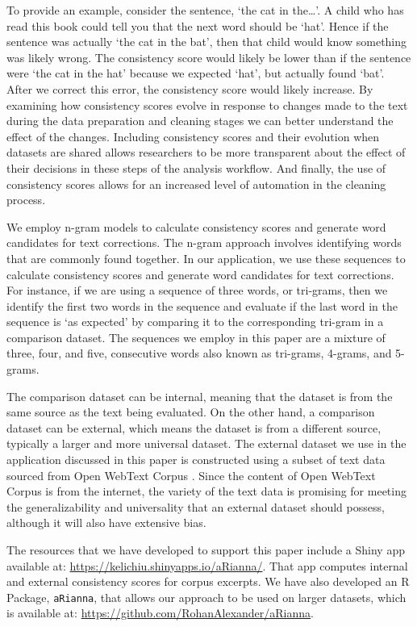 \documentclass[11pt,]{article}
\begin{document}
To provide an example, consider the sentence, `the cat in the\dots'. A child who has read this book could tell you that the next word should be `hat'. Hence if the sentence was actually `the cat in the bat', then that child would know something was likely wrong. The consistency score would likely be lower than if the sentence were `the cat in the hat' because we expected `hat', but actually found `bat'. After we correct this error, the consistency score would likely increase. By examining how consistency scores evolve in response to changes made to the text during the data preparation and cleaning stages we can better understand the effect of the changes. Including consistency scores and their evolution when datasets are shared allows researchers to be more transparent about the effect of their decisions in these steps of the analysis workflow. And finally, the use of consistency scores allows for an increased level of automation in the cleaning process.

We employ n-gram models to calculate consistency scores and generate word candidates for text corrections. The n-gram approach involves identifying words that are commonly found together. In our application, we use these sequences to calculate consistency scores and generate word candidates for text corrections. For instance, if we are using a sequence of three words, or tri-grams, then we identify the first two words in the sequence and evaluate if the last word in the sequence is `as expected' by comparing it to the corresponding tri-gram in a comparison dataset. The sequences we employ in this paper are a mixture of three, four, and five, consecutive words also known as tri-grams, 4-grams, and 5-grams.

The comparison dataset can be internal, meaning that the dataset is from the same source as the text being evaluated. On the other hand, a comparison dataset can be external, which means the dataset is from a different source, typically a larger and more universal dataset. The external dataset we use in the application discussed in this paper is constructed using a subset of text data sourced from Open WebText Corpus \citep{Gokaslan2019OpenWeb}. Since the content of Open WebText Corpus is from the internet, the variety of the text data is promising for meeting the generalizability and universality that an external dataset should possess, although it will also have extensive bias.

The resources that we have developed to support this paper include a Shiny app available at: \url{https://kelichiu.shinyapps.io/aRianna/}. That app computes internal and external consistency scores for corpus excerpts. We have also developed an R Package, \texttt{aRianna}, that allows our approach to be used on larger datasets, which is available at: \url{https://github.com/RohanAlexander/aRianna}.
\end{document}
